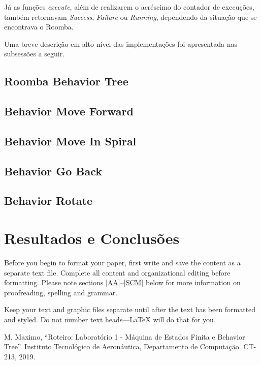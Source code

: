 \documentclass[conference]{IEEEtran}
\begin{document}
Já as funções \textit{execute}, além de realizarem o acréscimo do contador de execuções, também retornavam \textit{Success}, \textit{Failure} ou \textit{Running}, dependendo da situação que se encontrava o Roomba.

Uma breve descrição em alto nível das implementações foi apresentada nas subsessões a seguir.

\subsection{Roomba Behavior Tree}
\subsection{Behavior Move Forward}
\subsection{Behavior Move In Spiral}
\subsection{Behavior Go Back}
\subsection{Behavior Rotate}

\section{Resultados e Conclusões}
Before you begin to format your paper, first write and save the content as a 
separate text file. Complete all content and organizational editing before 
formatting. Please note sections \ref{AA}--\ref{SCM} below for more information on 
proofreading, spelling and grammar.

Keep your text and graphic files separate until after the text has been 
formatted and styled. Do not number text heads---{\LaTeX} will do that 
for you.

\begin{thebibliography}{00}
 M. Maximo, ``Roteiro: Laboratório 1 - Máquina de Estados Finita e Behavior Tree''. Instituto Tecnológico de Aeronáutica, Departamento de Computação. CT-213, 2019.
\end{thebibliography}
\end{document}
